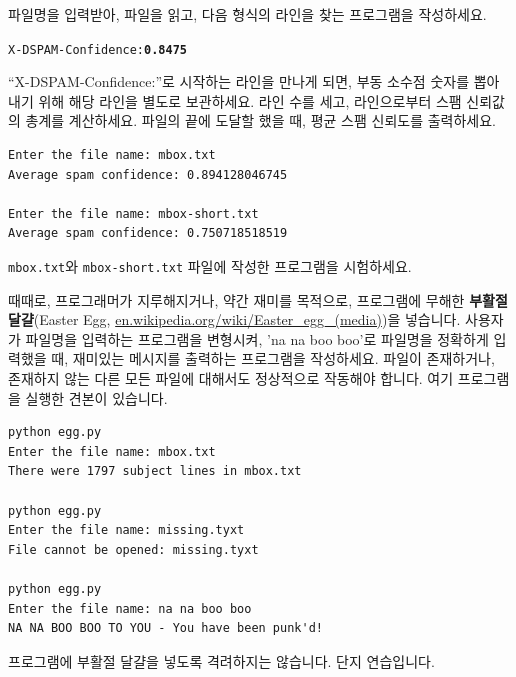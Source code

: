 \begin{ex}

파일명을 입력받아, 파일을 읽고, 다음 형식의 라인을 찾는 프로그램을 작성하세요.

\beforeverb
\begin{alltt}
X-DSPAM-Confidence: {\bf 0.8475}
\end{alltt}
\afterverb

``X-DSPAM-Confidence:''로 시작하는 라인을 만나게 되면, 부동 소수점 숫자를 뽑아내기 위해 해당 라인을 별도로 보관하세요.
라인 수를 세고, 라인으로부터 스팸 신뢰값의 총계를 계산하세요. 
파일의 끝에 도달할 했을 때, 평균 스팸 신뢰도를 출력하세요.

\beforeverb
\begin{verbatim}
Enter the file name: mbox.txt
Average spam confidence: 0.894128046745

Enter the file name: mbox-short.txt
Average spam confidence: 0.750718518519
\end{verbatim}
\afterverb
%
{\tt mbox.txt}와 {\tt mbox-short.txt} 파일에 작성한 프로그램을 시험하세요.
\end{ex}

\begin{ex}

때때로, 프로그래머가 지루해지거나, 약간 재미를 목적으로, 프로그램에 무해한 {\bf 부활절 달걀}(Easter Egg, \url{en.wikipedia.org/wiki/Easter_egg_(media)})을 넣습니다.
사용자가 파일명을 입력하는 프로그램을 변형시켜, 'na na boo boo'로 파일명을 정확하게 입력했을 때, 재미있는 메시지를 출력하는 프로그램을 작성하세요.
파일이 존재하거나, 존재하지 않는 다른 모든 파일에 대해서도 정상적으로 작동해야 합니다. 
여기 프로그램을 실행한 견본이 있습니다.

\beforeverb
\begin{verbatim}
python egg.py 
Enter the file name: mbox.txt
There were 1797 subject lines in mbox.txt

python egg.py 
Enter the file name: missing.tyxt
File cannot be opened: missing.tyxt

python egg.py 
Enter the file name: na na boo boo
NA NA BOO BOO TO YOU - You have been punk'd!
\end{verbatim}
\afterverb
%

프로그램에 부활절 달걀을 넣도록 격려하지는 않습니다. 단지 연습입니다.

\end{ex}

